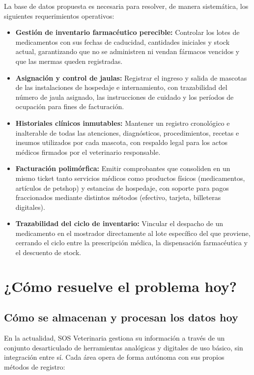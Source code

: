 La base de datos propuesta es necesaria para resolver, de manera sistemática, los siguientes requerimientos operativos:

\begin{itemize}
	\item \textbf{Gestión de inventario farmacéutico perecible:} Controlar los lotes de medicamentos con sus fechas de caducidad, cantidades iniciales y stock actual, garantizando que no se administren ni vendan fármacos vencidos y que las mermas queden registradas.
	\item \textbf{Asignación y control de jaulas:} Registrar el ingreso y salida de mascotas de las instalaciones de hospedaje e internamiento, con trazabilidad del número de jaula asignado, las instrucciones de cuidado y los períodos de ocupación para fines de facturación.
	\item \textbf{Historiales clínicos inmutables:} Mantener un registro cronológico e inalterable de todas las atenciones, diagnósticos, procedimientos, recetas e insumos utilizados por cada mascota, con respaldo legal para los actos médicos firmados por el veterinario responsable.
	\item \textbf{Facturación polimórfica:} Emitir comprobantes que consoliden en un mismo ticket tanto servicios médicos como productos físicos (medicamentos, artículos de petshop) y estancias de hospedaje, con soporte para pagos fraccionados mediante distintos métodos (efectivo, tarjeta, billeteras digitales).
	\item \textbf{Trazabilidad del ciclo de inventario:} Vincular el despacho de un medicamento en el mostrador directamente al lote específico del que proviene, cerrando el ciclo entre la prescripción médica, la dispensación farmacéutica y el descuento de stock.
\end{itemize}

\section{¿Cómo resuelve el problema hoy?}

\subsection{Cómo se almacenan y procesan los datos hoy}

En la actualidad, SOS Veterinaria gestiona su información a través de un conjunto desarticulado de herramientas analógicas y digitales de uso básico, sin integración entre sí. Cada área opera de forma autónoma con sus propios métodos de registro:

